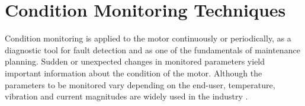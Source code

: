 

	   
		
		

\section{Condition Monitoring Techniques}

Condition monitoring is applied to the motor continuously or periodically, as a diagnostic tool for fault detection and as one of the fundamentals of maintenance planning. Sudden or unexpected changes in monitored parameters yield important information about the condition of the motor. Although the parameters to be monitored vary depending on the end-user, temperature, vibration and current magnitudes are widely used in the industry \cite{mistry2016rotating}.

